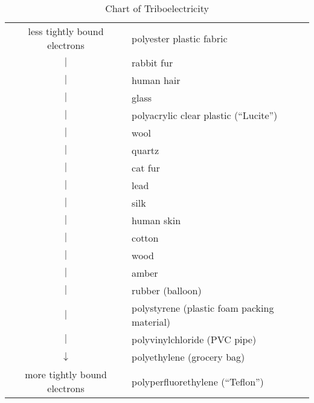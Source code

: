 \begin{table}[htdp]
\centering
\caption{Chart of Triboelectricity}
\begin{tabular}{cl} \hline
\centering
less tightly bound electrons	
	  		& polyester plastic fabric \\
$|$		  	& rabbit fur \\
$|$			& human hair \\
$|$			& glass \\
$|$			& polyacrylic clear plastic (``Lucite'') \\
$|$			& wool \\
$|$			& quartz \\
$|$			& cat fur \\
$|$			& lead \\
$|$			& silk \\
$|$			& human skin \\
$|$			& cotton \\
$|$			& wood \\
$|$			& amber \\
$|$			& rubber (balloon) \\
$|$			& polystyrene (plastic foam packing material) \\
$|$			& polyvinylchloride (PVC pipe) \\
$\downarrow$ 	& polyethylene (grocery bag) \\
more tightly bound electrons
	& polyperfluorethylene (``Teflon'') \\
\hline

\end{tabular}
\end{table}
\endinput
